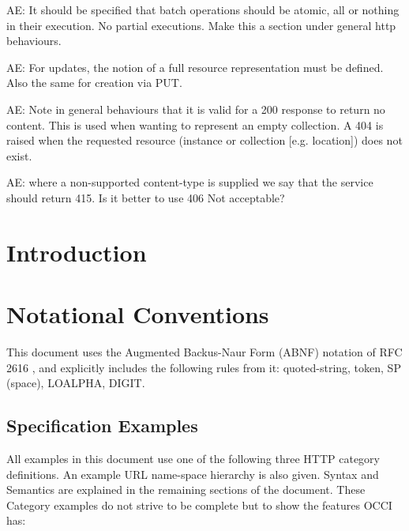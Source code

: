 \documentclass[10pt,a4paper]{article}
\begin{document}
AE: It should be specified that batch operations should be atomic, all or nothing in their execution. 
No partial executions. Make this a section under general http behaviours.

AE: For updates, the notion of a full resource representation must be defined. Also the same for
creation via PUT.

AE: Note in general behaviours that it is valid for a 200 response to return no content. This is used
when wanting to represent an empty collection. A 404 is raised when the requested resource 
(instance or collection [e.g. location]) does not exist.

AE: where a non-supported content-type is supplied we say that the service should return 415. Is it better to use 406 Not acceptable?

\newpage
\tableofcontents
\newpage

\section{Introduction}


\section{Notational Conventions}


This document uses the Augmented Backus-Naur Form (ABNF) notation of
RFC 2616 \cite{rfc2616}, and explicitly includes the following rules
from it: quoted-string, token, SP (space), LOALPHA, DIGIT.

\subsection{Specification Examples}
All examples in this document use one of the following three HTTP
category definitions. An example URL name-space hierarchy is also
given. Syntax and Semantics are explained in the remaining sections of
the document. These Category examples do not strive to be complete but
to show the features OCCI has:
\end{document}
